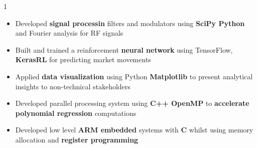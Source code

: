 \documentclass[11pt,a4paper,ragged2e]{altacv}
\begin{document}
\begin{paracol}{1}
\begin{itemize}
\item Developed \textbf{signal processin} filters and modulators using  \textbf{SciPy Python} and Fourier analysis for RF signals 
\item Built and trained a reinforcement \textbf{neural network} using TensorFlow, \textbf{KerasRL} for predicting market movements
\item Applied \textbf{data visualization} using Python \textbf{Matplotlib} to present analytical insights to non-technical stakeholders
\item Developed parallel processing system using \textbf{C++ OpenMP} to \textbf{accelerate polynomial regression} computations
\item Developed low level \textbf{ARM embedded} systems with \textbf{C} whilst using memory allocation and \textbf{register programming}
\end{itemize}




\end{paracol}
\end{document}
